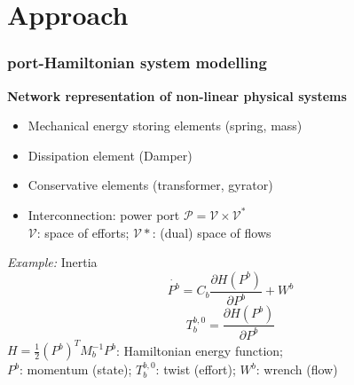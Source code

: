 \documentclass[student]{ITRslides}
\begin{document}
\section{Approach}
\begin{frame}
	\frametitle{port-Hamiltonian system modelling}

	\textbf{Network representation of non-linear physical systems\\}
	\begin{itemize}
	
		\item Mechanical energy storing elements (spring, mass)
		\item Dissipation element (Damper)
		\item Conservative elements (transformer, gyrator)
		\item Interconnection: power port $ \mathcal{P} = \mathcal{V} \times \mathcal{V}^* $ \\ $\mathcal{V}$: space of efforts; $\mathcal{V}*$: (dual) space of flows
		\end{itemize}
		\textit{Example:} Inertia
\[
	\dot{P^b} = C_b \frac{\partial H(P^b)}{\partial P^b} +  W^b \]
	\[T_b^{b,0} = \frac{\partial H(P^b)}{\partial P^b}
\]
$H = \frac{1}{2} (P^b)^T M_b^{-1} P^b$: Hamiltonian energy function;\\ $P^b$: momentum (state); $T_b^{b,0}$: twist (effort); $W^b$: wrench (flow)
		

\end{frame}
\end{document}
